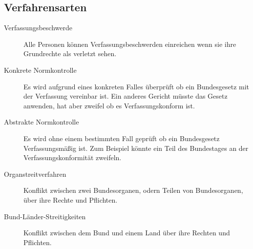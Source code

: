 \documentclass{article}
\begin{document}
\subsection{Verfahrensarten}
\begin{description}
 \item[Verfassungsbeschwerde] Alle Personen können Verfassungsbeschwerden einreichen wenn sie ihre Grundrechte als verletzt sehen.
 \item[Konkrete Normkontrolle] Es wird aufgrund eines konkreten Falles überprüft ob ein Bundesgesetz mit der Verfassung vereinbar ist. Ein anderes Gericht müsste das Gesetz anwenden, hat aber zweifel ob es Verfassungskonform ist.
 \item[Abstrakte Normkontrolle] Es wird ohne einem bestimmten Fall geprüft ob ein Bundesgesetz Verfassungsmäßig ist. Zum Beispiel könnte ein Teil des Bundestages an der Verfassungskonformität zweifeln.
 \item[Organstreitverfahren] Konflikt zwischen zwei Bundesorganen, odern Teilen von Bundesorganen, über ihre Rechte und Pflichten.
 \item[Bund-Länder-Streitigkeiten] Konflikt zwischen dem Bund und einem Land über ihre Rechten und Pflichten.
\end{description}
\end{document}
